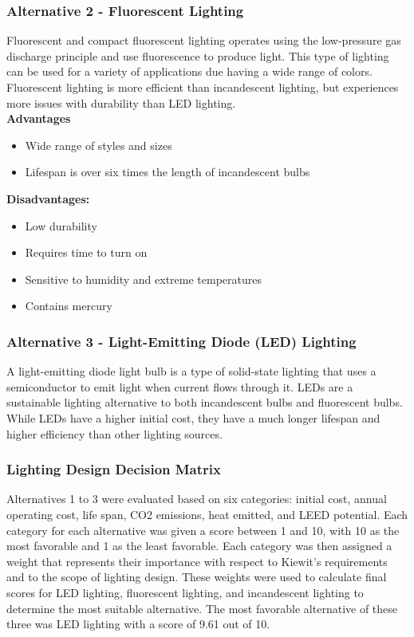 \documentclass{ceri}
\begin{document}
\subsubsection{Alternative 2 - Fluorescent Lighting}

Fluorescent and compact fluorescent lighting operates using the low-pressure gas discharge principle and use fluorescence to produce light. This type of lighting can be used for a variety of applications due having a wide range of colors. Fluorescent lighting is more efficient than incandescent lighting, but experiences more issues with durability than LED lighting.\\

\newline
\textbf{Advantages}
\begin{itemize}
    \item Wide range of styles and sizes
    \item Lifespan is over six times the length of incandescent bulbs
\end{itemize}
\textbf{Disadvantages:}
\begin{itemize}
    \item Low durability
    \item Requires time to turn on
    \item Sensitive to humidity and extreme temperatures
    \item Contains mercury
\end{itemize}

\subsubsection{Alternative 3 - Light-Emitting Diode (LED) Lighting}

A light-emitting diode light bulb is a type of solid-state lighting that uses a semiconductor to emit light when current flows through it. LEDs are a sustainable lighting alternative to both incandescent bulbs and fluorescent bulbs. While LEDs have a higher initial cost, they have a much longer lifespan and higher efficiency than other lighting sources.\\




\subsubsection{Lighting Design Decision Matrix}
Alternatives 1 to 3 were evaluated based on six categories: initial cost, annual operating cost, life span, CO2 emissions, heat emitted, and LEED potential. Each category for each alternative was given a score between 1 and 10, with 10 as the most favorable and 1 as the least favorable. Each category was then assigned a weight that represents their importance with respect to Kiewit’s requirements and to the scope of lighting design. These weights were used to calculate final scores for LED lighting, fluorescent lighting, and incandescent lighting to determine the most suitable alternative. The most favorable alternative of these three was LED lighting with a score of 9.61 out of 10.
\end{document}
